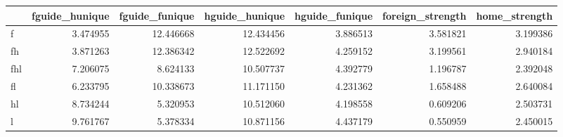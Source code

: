 \begin{tabular}{lrrrrrr}
\toprule
 & fguide_hunique & fguide_funique & hguide_hunique & hguide_funique & foreign_strength & home_strength \\
\midrule
f & 3.474955 & 12.446668 & 12.434456 & 3.886513 & 3.581821 & 3.199386 \\
fh & 3.871263 & 12.386342 & 12.522692 & 4.259152 & 3.199561 & 2.940184 \\
fhl & 7.206075 & 8.624133 & 10.507737 & 4.392779 & 1.196787 & 2.392048 \\
fl & 6.233795 & 10.338673 & 11.171150 & 4.231362 & 1.658488 & 2.640084 \\
hl & 8.734244 & 5.320953 & 10.512060 & 4.198558 & 0.609206 & 2.503731 \\
l & 9.761767 & 5.378334 & 10.871156 & 4.437179 & 0.550959 & 2.450015 \\
\bottomrule
\end{tabular}

